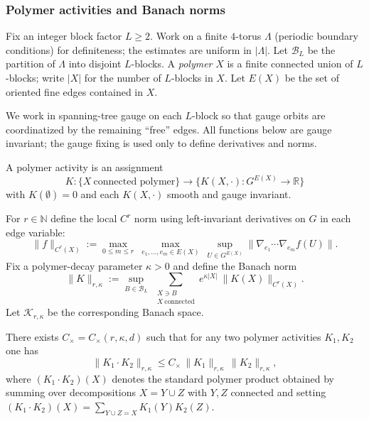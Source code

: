 \subsubsection{Polymer activities and Banach norms}
\label{subsec:polymer_banach}

Fix an integer block factor $L\ge 2$.
Work on a finite $4$-torus $\Lambda$ (periodic boundary conditions) for definiteness; the estimates are uniform in $|\Lambda|$.
Let $\mathcal B_L$ be the partition of $\Lambda$ into disjoint $L$-blocks.
A \emph{polymer} $X$ is a finite connected union of $L$-blocks; write $|X|$ for the number of $L$-blocks in $X$.
Let $E(X)$ be the set of oriented fine edges contained in $X$.

We work in spanning-tree gauge on each $L$-block so that gauge orbits are coordinatized by the remaining ``free'' edges.
All functions below are gauge invariant; the gauge fixing is used only to define derivatives and norms.

\begin{definition}
A polymer activity is an assignment
\[K:\{X\ \text{connected polymer}\}\to \{K(X,\cdot):G^{E(X)}\to\mathbb R\}\]
with $K(\emptyset)=0$ and each $K(X,\cdot)$ smooth and gauge invariant.
\end{definition}

For $r\in\mathbb N$ define the local $C^r$ norm using left-invariant derivatives on $G$ in each edge variable:
\[
\|f\|_{C^r(X)}:=\max_{0\le m\le r}\ \max_{e_1,\dots,e_m\in E(X)}\ \sup_{U\in G^{E(X)}}\|\nabla_{e_1}\cdots\nabla_{e_m}f(U)\|.
\]
Fix a polymer-decay parameter $\kappa>0$ and define the Banach norm
\begin{equation}\label{eq:polymer_norm}
\|K\|_{r,\kappa}:=\sup_{B\in\mathcal B_L}\ \sum_{\substack{X\ni B\\ X\ \text{connected}}} e^{\kappa |X|}\ \|K(X)\|_{C^r(X)}.
\end{equation}
Let $\mathcal K_{r,\kappa}$ be the corresponding Banach space.

\begin{lemma}\label{lem:polymer_algebra}
There exists $C_{\times}=C_{\times}(r,\kappa,d)$ such that for any two polymer activities $K_1,K_2$ one has
\[
\|K_1\cdot K_2\|_{r,\kappa}\le C_{\times}\,\|K_1\|_{r,\kappa}\,\|K_2\|_{r,\kappa},
\]
where $(K_1\cdot K_2)(X)$ denotes the standard polymer product obtained by summing over decompositions $X=Y\cup Z$ with $Y,Z$ connected and
setting $(K_1\cdot K_2)(X)=\sum_{Y\cup Z=X}K_1(Y)K_2(Z)$.
\end{lemma}

